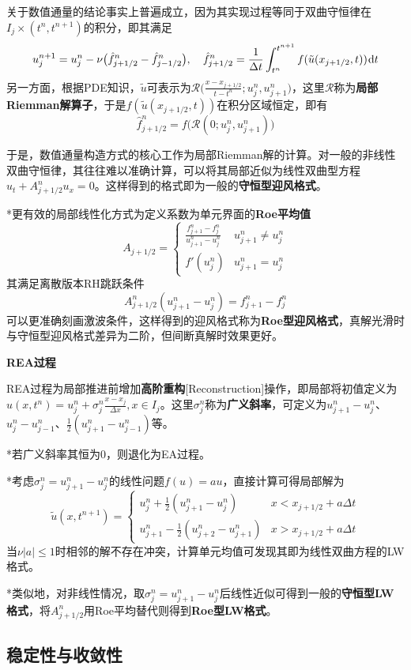 \documentclass[a4paper,UTF8,fontset=windows]{ctexart}
\newcommand*{\dr}{\hspace{0.07em}\mathrm{d}}
\begin{document}
关于数值通量的结论事实上普遍成立，因为其实现过程等同于双曲守恒律在$I_j\times(t^n,t^{n+1})$的积分，即其满足
$$u_j^{n+1}=u_j^n-\nu\big(\hat{f}_{j+1/2}^n-\hat{f}_{j-1/2}^n\big),\quad\hat{f}_{j+1/2}^n=\frac{1}{\Delta t}\int_{t^n}^{t^{n+1}}f(\tilde{u}(x_{j+1/2},t))\dr t$$
另一方面，根据PDE知识，$\tilde{u}$可表示为$\mathcal{R}\big(\frac{x-x_{j+1/2}}{t-t^n};u_j^n,u_{j+1}^n\big)$，这里$\mathcal{R}$称为\textbf{局部Riemman解算子}，于是$f(\tilde{u}(x_{j+1/2},t))$在积分区域恒定，即有
$$\hat{f}_{j+1/2}^n=f\big(\mathcal{R}(0;u_j^n,u_{j+1}^n)\big)$$

于是，数值通量构造方式的核心工作为局部Riemman解的计算。对一般的非线性双曲守恒律，其往往难以准确计算，可以将其局部近似为线性双曲型方程$u_t+A_{j+1/2}^nu_x=0$。这样得到的格式即为一般的\textbf{守恒型迎风格式}。

*更有效的局部线性化方式为定义系数为单元界面的\textbf{Roe平均值}
$$A_{j+1/2}=\begin{cases}\frac{f_{j+1}^n-f_j^n}{u_{j+1}^n-u_j^n}&u_{j+1}^n\ne u_j^n\\f'(u_j^n)&u_{j+1}^n=u_j^n\end{cases}$$
其满足离散版本RH跳跃条件
$$A_{j+1/2}^n(u_{j+1}^n-u_j^n)=f_{j+1}^n-f_j^n$$
可以更准确刻画激波条件，这样得到的迎风格式称为\textbf{Roe型迎风格式}，真解光滑时与守恒型迎风格式差异为二阶，但间断真解时效果更好。

\textbf{REA过程}

REA过程为局部推进前增加\textbf{高阶重构}[Reconstruction]操作，即局部将初值定义为$u(x,t^n)=u_j^n+\sigma_j^n\frac{x-x_j}{\Delta x},x\in I_j$。这里$\sigma_j^n$称为\textbf{广义斜率}，可定义为$u_{j+1}^n-u_j^n$、$u_j^n-u_{j-1}^n$、$\frac{1}{2}(u_{j+1}^n-u_{j-1}^n)$等。

*若广义斜率其恒为0，则退化为EA过程。

*考虑$\sigma_j^n=u_{j+1}^n-u_j^n$的线性问题$f(u)=au$，直接计算可得局部解为
$$\tilde{u}(x,t^{n+1})=\begin{cases}u_j^n+\frac{1}{2}(u_{j+1}^n-u_j^n)&x<x_{j+1/2}+a\Delta t\\u_{j+1}^n-\frac{1}{2}(u_{j+2}^n-u_{j+1}^n)&x>x_{j+1/2}+a\Delta t\end{cases}$$
当$\nu|a|\le1$时相邻的解不存在冲突，计算单元均值可发现其即为线性双曲方程的LW格式。

*类似地，对非线性情况，取$\sigma_j^n=u_{j+1}^n-u_j^n$后线性近似可得到一般的\textbf{守恒型LW格式}，将$A_{j+1/2}^n$用Roe平均替代则得到\textbf{Roe型LW格式}。

\subsection{稳定性与收敛性}
\end{document}
